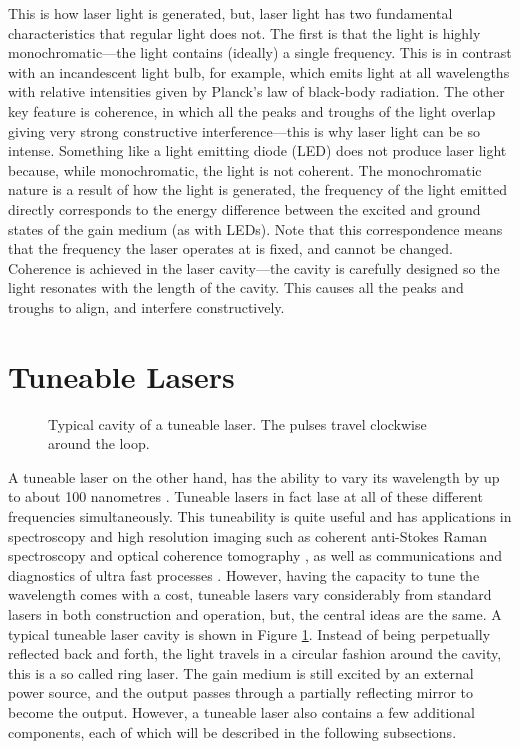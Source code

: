 This is how laser light is generated, but, laser light has two fundamental characteristics that regular light does not. The first is that the light is highly monochromatic---the light contains (ideally) a single frequency. This is in contrast with an incandescent light bulb, for example, which emits light at all wavelengths with relative intensities given by Planck's law of black-body radiation. The other key feature is coherence, in which all the peaks and troughs of the light overlap giving very strong constructive interference---this is why laser light can be so intense. Something like a light emitting diode (LED) does not produce laser light because, while monochromatic, the light is not coherent. The monochromatic nature is a result of how the light is generated, the frequency of the light emitted directly corresponds to the energy difference between the excited and ground states of the gain medium (as with LEDs). Note that this correspondence means that  the frequency the laser operates at is fixed, and cannot be changed. Coherence is achieved in the laser cavity---the cavity is carefully designed so the light resonates with the length of the cavity. This causes all the peaks and troughs to align, and interfere constructively. \\

\section{Tuneable Lasers}
\begin{figure}[tbp]
\centering

\caption[Typical cavity of a tuneable laser.]{Typical cavity of a tuneable laser. The pulses travel clockwise around the loop.}
\label{fig:cavity}
\end{figure}

A tuneable laser on the other hand, has the ability to vary its wavelength by up to about 100 nanometres \cite{bohun, burgoyne2010, yamashita}. Tuneable lasers in fact lase at all of these different frequencies simultaneously. This tuneability is quite useful and has applications in spectroscopy and high resolution imaging such as coherent anti-Stokes Raman spectroscopy and optical coherence tomography \cite{bohun, burgoyne2014, yamashita}, as well as communications and diagnostics of ultra fast processes \cite{silfvast}. However, having the capacity to tune the wavelength comes with a cost, tuneable lasers vary considerably from standard lasers in both construction and operation, but, the central ideas are the same. A typical tuneable laser cavity is shown in Figure \ref{fig:cavity}. Instead of being perpetually reflected back and forth, the light travels in a circular fashion around the cavity, this is a so called ring laser. The gain medium is still excited by an external power source, and the output passes through a partially reflecting mirror to become the output. However, a tuneable laser also contains a few additional components, each of which will be described in the following subsections. 

